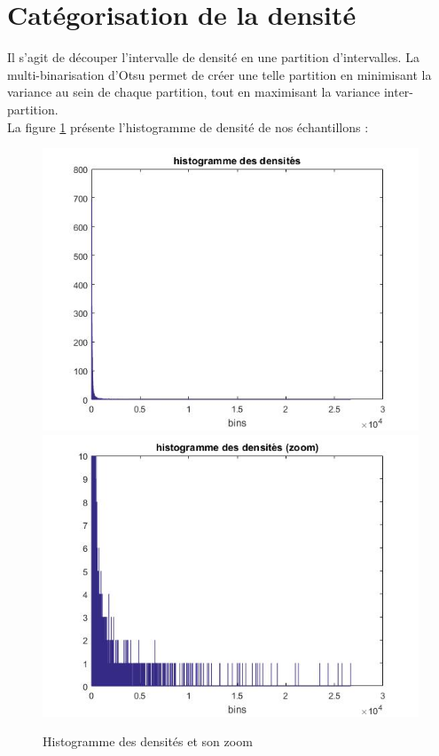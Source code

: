 \documentclass{book}
\begin{document}
\section{Catégorisation de la densité}

Il s'agit de découper l'intervalle de densité en une partition d'intervalles. La multi-binarisation d'Otsu permet de créer une telle partition en
minimisant la variance au sein de chaque partition, tout en maximisant la variance inter-partition.\\
La figure \ref{densite_histo} présente l'histogramme de densité de nos échantillons :

\begin{figure}[H]
\begin{center}
\includegraphics[scale=0.5]{images/densite_histo.jpg}
\includegraphics[scale=0.5]{images/densite_histo_zoom.jpg}
\end{center}
\caption{Histogramme des densités et son zoom}
\label{densite_histo}
\end{figure}
\end{document}
